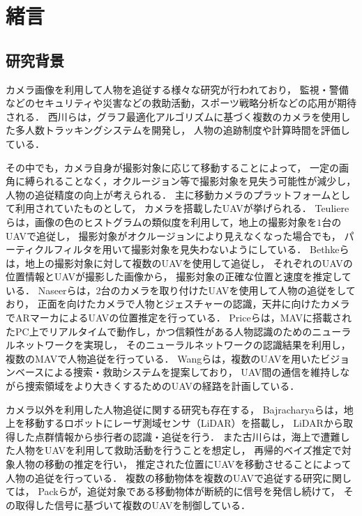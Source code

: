 \documentclass[autodetect-engine,dvipdfmx-if-dvi,ja=standard,a4j,jbase=11pt,magstyle=nomag*]{bxjsreport}
\begin{document}
\chapter{緒言}

\section{研究背景}

カメラ画像を利用して人物を追従する様々な研究が行われており，
監視・警備などのセキュリティや災害などの救助活動，スポーツ戦略分析などの応用が期待される．
西川らは，グラフ最適化アルゴリズムに基づく複数のカメラを使用した多人数トラッキングシステムを開発し，
人物の追跡制度や計算時間を評価している\cite{nishikawa_2018, nishikawa_2018_2}．

その中でも，カメラ自身が撮影対象に応じて移動することによって，
一定の画角に縛られることなく，オクルージョン等で撮影対象を見失う可能性が減少し，
人物の追従精度の向上が考えられる．
主に移動カメラのプラットフォームとして利用されていたものとして，
カメラを搭載したUAVが挙げられる．
Teuliereらは，画像の色のヒストグラムの類似度を利用して，地上の撮影対象を$1$台のUAVで追従し，
撮影対象がオクルージョンにより見えなくなった場合でも，
パーティクルフィルタを用いて撮影対象を見失わないようにしている\cite{Teuliere_2011}．
Bethkeらは，地上の撮影対象に対して複数のUAVを使用して追従し，
それぞれのUAVの位置情報とUAVが撮影した画像から，
撮影対象の正確な位置と速度を推定している\cite{bethke_2007}．
Naseerらは，$2$台のカメラを取り付けたUAVを使用して人物の追従をしており，
正面を向けたカメラで人物とジェスチャーの認識，天井に向けたカメラでARマーカによるUAVの位置推定を行っている\cite{nasser_2013}．
Priceらは，MAVに搭載されたPC上でリアルタイムで動作し，かつ信頼性がある人物認識のためのニューラルネットワークを実現し，
そのニューラルネットワークの認識結果を利用し，複数のMAVで人物追従を行っている\cite{price_2018}．
Wangらは，複数のUAVを用いたビジョンベースによる捜索・救助システムを提案しており，
UAV間の通信を維持しながら捜索領域をより大きくするためのUAVの経路を計画している\cite{wang_2009}．

カメラ以外を利用した人物追従に関する研究も存在する，
Bajracharyaらは，地上を移動するロボットにレーザ測域センサ（LiDAR）を搭載し，
LiDARから取得した点群情報から歩行者の認識・追従を行う\cite{bajracharya_2009}．
また古川らは，海上で遭難した人物をUAVを利用して救助活動を行うことを想定し，
再帰的ベイズ推定で対象人物の移動の推定を行い，
推定された位置にUAVを移動させることによって人物の追従を行っている\cite{furukawa_2006, furukawa_2012}．
複数の移動物体を複数のUAVで追従する研究に関しては，
Packらが，追従対象である移動物体が断続的に信号を発信し続けて，
その取得した信号に基づいて複数のUAVを制御している\cite{pack_2009}．
\end{document}
